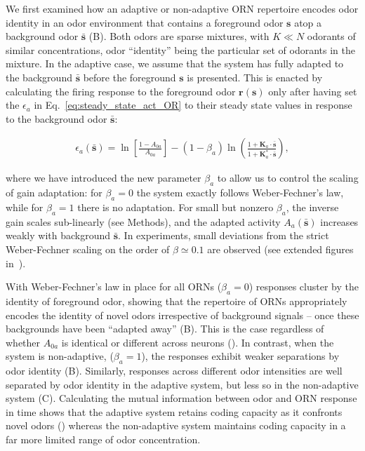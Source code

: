 \documentclass[9pt,lineno]{elife}
\begin{document}
We first examined how an adaptive or non-adaptive ORN repertoire encodes odor identity in an odor environment that contains a foreground odor $\mathbf{s}$ atop a background odor $\bar{\mathbf{s}}$ (B). Both odors are sparse mixtures, with $K \ll N$ odorants of similar concentrations, odor ``identity'' being the particular set of odorants in the mixture. In the adaptive case, we assume that the system has fully adapted to the background $\bar{\mathbf{s}}$ before the foreground $\mathbf{s}$ is presented. This is enacted by calculating the firing response to the foreground odor $\mathbf{r}(\mathbf{s})$ only after having set the $\epsilon_a$ in Eq.~\ref{eq:steady_state_act_OR} to their steady state values in response to the background odor $\bar{\mathbf{s}}$: {\color{blue} 

\begin{align}
\epsilon_{a}(\bar{\mathbf s}) = \ln\left[\frac{1-A_{0a}}{A_{0a}}\right] - \left(1-\beta_a\right)\ln\left(\frac{1 + \mathbf{K}_a\cdot\bar{\mathbf{s}}}{1 + \mathbf{K}^*_a\cdot\bar{\mathbf{s}}}\right),
\label{eq:beta}
\end{align}

where we have introduced the new parameter $\beta_a$ to allow us to control the scaling of gain adaptation: for $\beta_a=0$ the system exactly follows Weber-Fechner's law, while for $\beta_a=1$ there is no adaptation. For small but nonzero $\beta_a$, the inverse gain scales sub-linearly (see Methods), and the adapted activity $A_a(\bar{\mathbf s})$ increases weakly with background $\bar{\mathbf s}$. In experiments, small deviations from the strict Weber-Fechner scaling on the order of $\beta\simeq 0.1$ are observed (see extended figures in~\citep{srinivas_elife}).}



With Weber-Fechner's law in place for all ORNs ($\beta_a=0$) responses cluster by the identity of foreground odor, showing that the repertoire of ORNs appropriately encodes the identity of novel odors irrespective of background signals -- once these backgrounds have been ``adapted away'' (B). {\color{blue} This is the case regardless of whether $A_{0a}$ is identical or different across neurons ().} In contrast, when the system is non-adaptive, ($\beta_a=1$), the responses exhibit weaker separations by odor identity (B). Similarly, responses across different odor intensities are well separated by odor identity in the adaptive system, but less so in the non-adaptive system (C). Calculating the mutual information between odor and ORN response in time shows that the adaptive system retains coding capacity as it confronts novel odors () whereas the non-adaptive system maintains coding capacity in a far more limited range of odor concentration.
\end{document}
